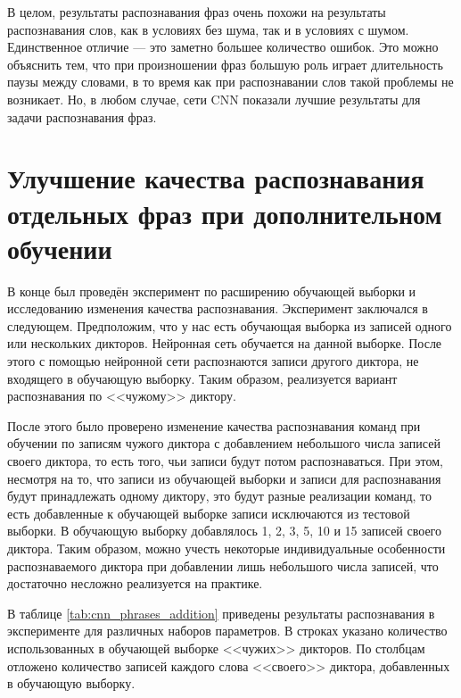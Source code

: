 В целом, результаты распознавания фраз очень похожи на результаты распознавания слов, как в условиях без шума, так и в условиях с шумом.
Единственное отличие --- это заметно большее количество ошибок.
Это можно объяснить тем, что при произношении фраз большую роль играет длительность паузы между словами, в то время как при распознавании слов такой проблемы не возникает.
Но, в любом случае, сети CNN показали лучшие результаты для задачи распознавания фраз.

\clearpage


\section{Улучшение качества распознавания отдельных фраз при дополнительном обучении} \label{sect4_6}

В конце был проведён эксперимент по расширению обучающей выборки и исследованию изменения качества распознавания.
Эксперимент заключался в следующем.
Предположим, что у нас есть обучающая выборка из записей одного или нескольких дикторов.
Нейронная сеть обучается на данной выборке.
После этого с помощью нейронной сети распознаются записи другого диктора, не входящего в обучающую выборку.
Таким образом, реализуется вариант распознавания по <<чужому>> диктору.

После этого было проверено изменение качества распознавания команд при обучении по записям чужого диктора с добавлением небольшого числа записей своего диктора, то есть того, чьи записи будут потом распознаваться.
При этом, несмотря на то, что записи из обучающей выборки и записи для распознавания будут принадлежать одному диктору, это будут разные реализации команд, то есть добавленные к обучающей выборке записи исключаются из тестовой выборки.
В обучающую выборку добавлялось 1, 2, 3, 5, 10 и 15 записей своего диктора.
Таким образом, можно учесть некоторые индивидуальные особенности распознаваемого диктора при добавлении лишь небольшого числа записей, что достаточно несложно реализуется на практике.

В таблице \ref{tab:cnn_phrases_addition} приведены результаты распознавания в эксперименте для различных наборов параметров.
В строках указано количество использованных в обучающей выборке <<чужих>> дикторов.
По столбцам отложено количество записей каждого слова <<своего>> диктора, добавленных в обучающую выборку.

